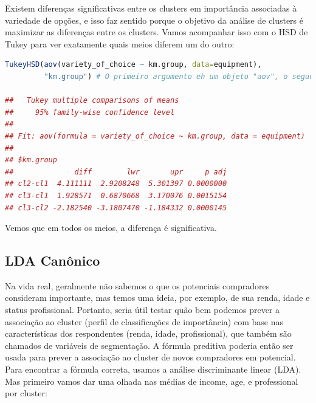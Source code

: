 \documentclass{article}
\begin{document}
Existem diferenças significativas entre os clusters em importância associadas à variedade de opções, e isso faz sentido porque o objetivo da análise de clusters é maximizar as diferenças entre os clusters. Vamos acompanhar isso com o HSD de Tukey para ver exatamente quais meios diferem um do outro:

\newpage
\begin{lstlisting}[language=R]
TukeyHSD(aov(variety_of_choice ~ km.group, data=equipment), 
         "km.group") # O primeiro argumento eh um objeto "aov", o segundo eh a nossa variavel independente.
         
##   Tukey multiple comparisons of means
##     95% family-wise confidence level
## 
## Fit: aov(formula = variety_of_choice ~ km.group, data = equipment)
## 
## $km.group
##              diff        lwr       upr     p adj
## cl2-cl1  4.111111  2.9208248  5.301397 0.0000000
## cl3-cl1  1.928571  0.6870668  3.170076 0.0015154
## cl3-cl2 -2.182540 -3.1807470 -1.184332 0.0000145

\end{lstlisting}
Vemos que em todos os meios, a diferença é significativa.

\subsection{LDA Canônico}

Na vida real, geralmente não sabemos o que os potenciais compradores consideram importante, mas temos uma ideia, por exemplo, de sua renda, idade e status profissional. Portanto, seria útil testar quão bem podemos prever a associação ao cluster (perfil de classificações de importância) com base nas características dos respondentes (renda, idade, profissional), que também são chamados de variáveis de segmentação. A fórmula preditiva poderia então ser usada para prever a associação ao cluster de novos compradores em potencial. Para encontrar a fórmula correta, usamos a análise discriminante linear (LDA). Mas primeiro vamos dar uma olhada nas médias de income, age, e professional por cluster:
\end{document}
